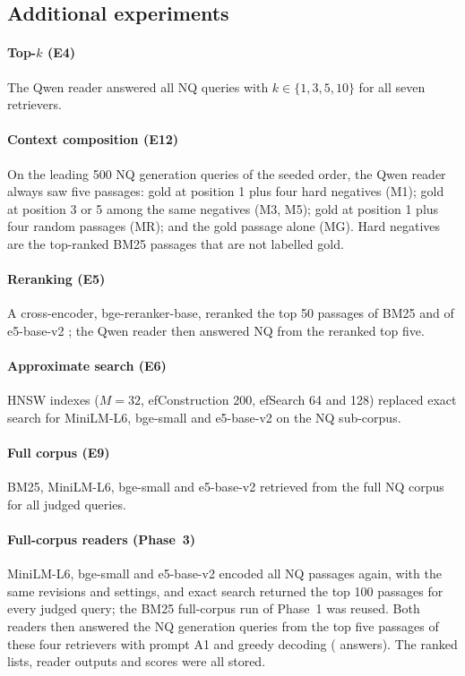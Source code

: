 \subsection{Additional experiments}\label{sec:extra}
\paragraph{Top-$k$ (E4)} The Qwen reader answered all NQ queries with $k\in\{1,3,5,10\}$ for all seven retrievers.
\paragraph{Context composition (E12)} On the leading 500 NQ generation queries of the seeded order, the Qwen reader always saw five passages: gold at position 1 plus four hard negatives (M1); gold at position 3 or 5 among the same negatives (M3, M5); gold at position 1 plus four random passages (MR); and the gold passage alone (MG). Hard negatives are the top-ranked BM25 passages that are not labelled gold.
\paragraph{Reranking (E5)} A cross-encoder, bge-reranker-base, reranked the top 50 passages of BM25 and of e5-base-v2 \citep{nogueira2019passage,xiao2024cpack}; the Qwen reader then answered NQ from the reranked top five.
\paragraph{Approximate search (E6)} HNSW indexes \citep{malkov2020hnsw} ($M=32$, efConstruction 200, efSearch 64 and 128) replaced exact search for MiniLM-L6, bge-small and e5-base-v2 on the NQ sub-corpus.
\paragraph{Full corpus (E9)} BM25, MiniLM-L6, bge-small and e5-base-v2 retrieved from the full NQ corpus for all judged queries.
\paragraph{Full-corpus readers (Phase~3)} MiniLM-L6, bge-small and e5-base-v2 encoded all  NQ passages again, with the same revisions and settings, and exact search returned the top 100 passages for every judged query; the BM25 full-corpus run of Phase~1 was reused. Both readers then answered the  NQ generation queries from the top five passages of these four retrievers with prompt A1 and greedy decoding ( answers). The ranked lists, reader outputs and scores were all stored.
